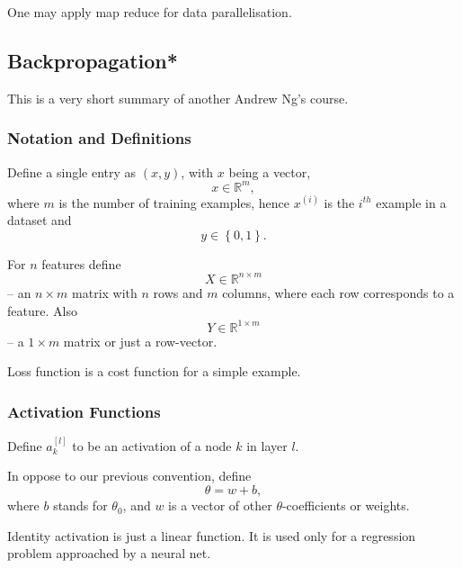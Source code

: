 \documentclass[a4paper,11pt]{article}
\begin{document}
One may apply map reduce for data parallelisation.
\subsection{Backpropagation*}
This is a very short summary of another Andrew Ng's course.
\subsubsection{Notation and Definitions}
Define a single entry as \textcolor{OliveGreen}{$(x, y)$}, with \textcolor{OliveGreen}{$x$} being a vector,
\begin{equation}
x \in \mathbb{R}^m ,
\end{equation}
where \textcolor{OliveGreen}{$m$} is the number of training examples, hence \textcolor{OliveGreen}{$x^{(i)}$} is the \textcolor{OliveGreen}{$i^{th}$} example in a dataset and
\begin{equation}
y \in \left\lbrace 0, 1 \right\rbrace .
\end{equation}

For \textcolor{OliveGreen}{$n$} features define
\begin{equation}
X \in \mathbb{R}^{n \times m}
\end{equation}
-- an \textcolor{OliveGreen}{$n \times m$} matrix with \textcolor{OliveGreen}{$n$} rows and \textcolor{OliveGreen}{$m$} columns, where each row corresponds to a feature. Also
\begin{equation}
Y \in \mathbb{R}^{1 \times m}
\end{equation}
-- a \textcolor{OliveGreen}{$1 \times m$} matrix or just a row-vector.

Loss function is a cost function for a simple example.
\subsubsection{Activation Functions}
Define \textcolor{OliveGreen}{$a^{[l]}_k$} to be an activation of a node \textcolor{OliveGreen}{$k$} in layer \textcolor{OliveGreen}{$l$}.

In oppose to our previous convention, define
\begin{equation}
\theta = w + b ,
\end{equation}
where \textcolor{OliveGreen}{$b$} stands for \textcolor{OliveGreen}{$\theta_0$}, and \textcolor{OliveGreen}{$w$} is a vector of other \textcolor{OliveGreen}{$\theta$}-coefficients or weights.

Identity activation is just a linear function. It is used only for a regression problem approached by a neural net.
\end{document}
